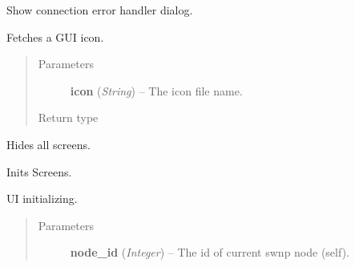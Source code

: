 \documentclass[letterpaper,10pt,english]{sphinxmanual}
\begin{document}
\begin{fulllineitems}
\begin{fulllineitems}
\end{fulllineitems}


\begin{fulllineitems}
\label{graphicaldesign:graphicaldesign.GUItemplate.ConnectionErrorHandler}
Show connection error handler dialog.

\end{fulllineitems}


\begin{fulllineitems}
\label{graphicaldesign:graphicaldesign.GUItemplate.GetProgramIcon}
Fetches a GUI icon.
\begin{quote}\begin{description}
\item[{Parameters}] \leavevmode
\textbf{icon} (\emph{String}) -- The icon file name.

\item[{Return type}] \leavevmode
{}

\end{description}\end{quote}

\end{fulllineitems}


\begin{fulllineitems}
\label{graphicaldesign:graphicaldesign.GUItemplate.HideScreens}
Hides all screens.

\end{fulllineitems}


\begin{fulllineitems}
\label{graphicaldesign:graphicaldesign.GUItemplate.InitScreens}
Inits Screens.

\end{fulllineitems}


\begin{fulllineitems}
\label{graphicaldesign:graphicaldesign.GUItemplate.InitUI}
UI initializing.
\begin{quote}\begin{description}
\item[{Parameters}] \leavevmode
\textbf{node\_id} (\emph{Integer}) -- The id of current swnp node (self).


\end{description}
\end{quote}
\end{fulllineitems}
\end{fulllineitems}
\end{document}
